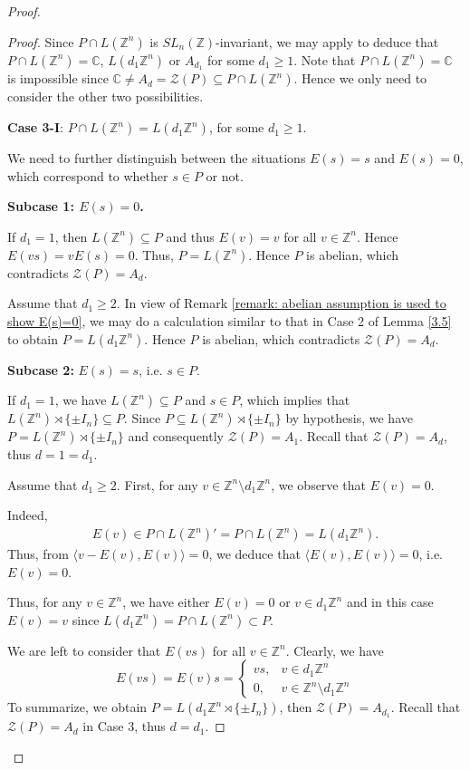 \documentclass[12pt]{amsart}
\theoremstyle{definition}
\theoremstyle{remark}
\begin{document}
\begin{proof}
\begin{proof}
Since $P\cap L(\mathbb{Z}^n)$ is $SL_n(\mathbb{Z})$-invariant, we may apply \cite[Example 5.9]{wit} to deduce that $P\cap L(\mathbb{Z}^n)=\mathbb{C}$, $L(d_{1}\mathbb{Z}^n)$ or $A_{d_1}$ for some $d_{1}\geq 1$. Note that $P\cap L(\mathbb{Z}^n)=\mathbb{C}$ is impossible since  $\mathbb{C}\neq A_d=\mathcal{Z}(P)\subseteq P\cap L(\mathbb{Z}^n)$. Hence we only need to consider the other two possibilities.


\textbf{Case 3-I}: $P\cap L(\mathbb{Z}^n)=L(d_{1}\mathbb{Z}^n)$, for some $d_1\ge 1$.

We need to further distinguish between the situations $E(s)=s$ and $E(s)=0$, which correspond to whether $s\in P$ or not.

\textbf{Subcase 1: $E(s) = 0$.}

If $d_{1}=1$, then $L(\mathbb{Z}^n)\subseteq P$ and thus $E(v)=v$ for all $v\in\mathbb{Z}^n$. Hence  $E(vs)=vE(s)=0$. Thus, $P=L(\mathbb{Z}^n)$. Hence $P$ is abelian, which  contradicts $\mathcal{Z}(P) = A_{d}$.

Assume that $d_{1}\geq 2$. In view of Remark \ref{remark: abelian assumption is used to show E(s)=0}, we may do a calculation similar to that in Case 2 of Lemma \ref{3.5}  to obtain $P = L(d_{1}\mathbb{Z}^n)$. Hence $P$ is abelian, which  contradicts $\mathcal{Z}(P) = A_{d}$.

\textbf{Subcase 2:} $E(s) = s$, i.e. $s\in P$.

If $d_{1}=1$, we have $L(\mathbb{Z}^n)\subseteq P$ and $s\in P$, which implies that $L(\mathbb{Z}^n) \rtimes \{\pm I_{n}\} \subseteq P$. Since $P\subseteq L(\mathbb{Z}^n) \rtimes \{\pm I_{n}\}$ by hypothesis, we have $P = L(\mathbb{Z}^n) \rtimes \{\pm I_{n}\}$ and consequently $\mathcal{Z}(P) = A_{1}$. Recall that $\mathcal{Z}(P)=A_d$, thus $d = 1 = d_{1}$.

Assume that $d_{1}\ge2$. First, for any $v\in\mathbb{Z}^n\setminus {d_{1}\mathbb{Z}^n}$, we observe that $E(v)=0$.

Indeed, 
\begin{align*}
E(v)\in P\cap L(\mathbb{Z}^n)'=P\cap L(\mathbb{Z}^n)=L(d_1\mathbb{Z}^n).
\end{align*}
Thus, from $\langle v-E(v), E(v)\rangle=0$, we deduce that $\langle E(v), E(v) \rangle=0$, i.e. $E(v)=0$.

Thus, for any $v\in \mathbb{Z}^n$, we have either $E(v)=0$ or $v\in d_1\mathbb{Z}^n$ and in this case $E(v)=v$ since $L(d_1\mathbb{Z}^n)=P\cap L(\mathbb{Z}^n)\subset P$.

We are left to consider that $E(vs)$ for all $v\in \mathbb{Z}^n$. Clearly, we have
\begin{equation*}
E(vs)=E(v)s=\begin{cases} 
vs, & v \in d_1\mathbb{Z}^n \\
0, & v \in \mathbb{Z}^n \setminus d_1\mathbb{Z}^n
\end{cases}
\end{equation*}
To summarize, we obtain $P=L(d_{1}\mathbb{Z}^n\rtimes\{\pm I_{n}
\})$, then $\mathcal{Z}(P)=A_{d_{1}}$. Recall that $\mathcal{Z}(P) = A_{d}$ in Case 3, thus $d=d_1$.


\end{proof}
\end{proof}
\end{document}
